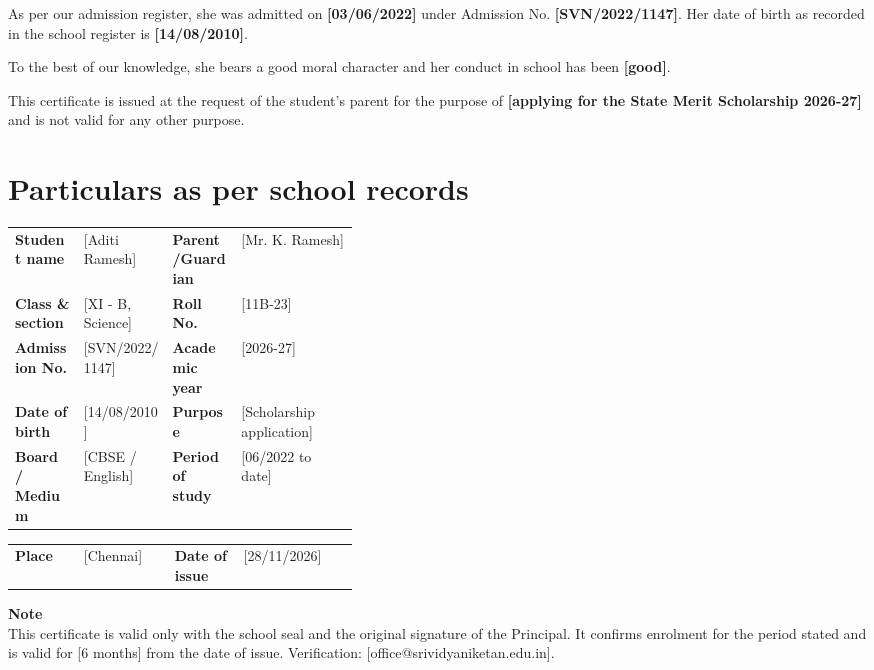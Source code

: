 \documentclass[10pt]{article}
\begin{document}
As per our admission register, she was admitted on \textbf{[03/06/2022]} under Admission No. \textbf{[SVN/2022/1147]}. Her date of birth as recorded in the school register is \textbf{[14/08/2010]}.\par\vspace{4pt}

To the best of our knowledge, she bears a good moral character and her conduct in school has been \textbf{[good]}.\par\vspace{4pt}

This certificate is issued at the request of the student's parent for the purpose of \textbf{[applying for the State Merit Scholarship 2026-27]} and is not valid for any other purpose.\par\vspace{4pt}

\section{Particulars as per school records}

\begin{tabularx}{\linewidth}{@{}p{0.2\linewidth}X p{0.2\linewidth}X@{}}
\textbf{Student name} & [Aditi Ramesh] & \textbf{Parent/Guardian} & [Mr. K. Ramesh] \\
\textbf{Class \& section} & [XI - B, Science] & \textbf{Roll No.} & [11B-23] \\
\textbf{Admission No.} & [SVN/2022/1147] & \textbf{Academic year} & [2026-27] \\
\textbf{Date of birth} & [14/08/2010] & \textbf{Purpose} & [Scholarship application] \\
\textbf{Board / Medium} & [CBSE / English] & \textbf{Period of study} & [06/2022 to date] \\
\end{tabularx}\par\vspace{2pt}

\begin{tabularx}{\linewidth}{@{}p{0.2\linewidth}X p{0.2\linewidth}X@{}}
\textbf{Place} & [Chennai] & \textbf{Date of issue} & [28/11/2026] \\
\end{tabularx}\par\vspace{2pt}

\noindent\colorbox{notebg}{\parbox{\dimexpr\linewidth-2\fboxsep}{\footnotesize {\color{accent}\bfseries Note}\\ This certificate is valid only with the school seal and the original signature of the Principal. It confirms enrolment for the period stated and is valid for [6 months] from the date of issue. Verification: [office@srividyaniketan.edu.in].}}\par\vspace{6pt}
\end{document}
